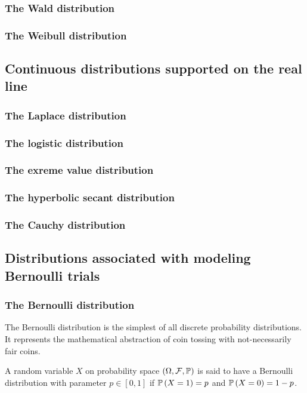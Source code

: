 \subsubsection{The Wald distribution}

\subsubsection{The Weibull distribution}

\subsection{Continuous distributions supported on the real line}

\subsubsection{The Laplace distribution}

\subsubsection{The logistic distribution}

\subsubsection{The exreme value distribution}

\subsubsection{The hyperbolic secant distribution}

\subsubsection{The Cauchy distribution}

\subsection{Distributions associated with modeling Bernoulli trials}

\subsubsection{The Bernoulli distribution\label{subsec:bernoulliDistribution}}

The Bernoulli distribution is the simplest of all discrete probability
distributions. It represents the mathematical abstraction of coin
tossing with not-necessarily fair coins.
\begin{defn}
\label{def:bernoulliDistribution}A random variable $X$ on probability
space $\probabilityspace$ is said to have a Bernoulli distribution
with parameter $p\in\left[0,1\right]$ if $\P\left(X=1\right)=p$
and $\P\left(X=0\right)=1-p$.
\end{defn}

